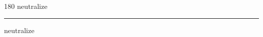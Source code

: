 
\begin{frame}
\begin{center}
\begin{turn}{180}
{\fontsize{2.5cm}{1em}\selectfont neutralize}
\end{turn}
\vspace{1em}\par  
\hrule
\vspace{1em}\par  
{\fontsize{2.5cm}{1em}\selectfont neutralize}
\end{center}
\end{frame}
